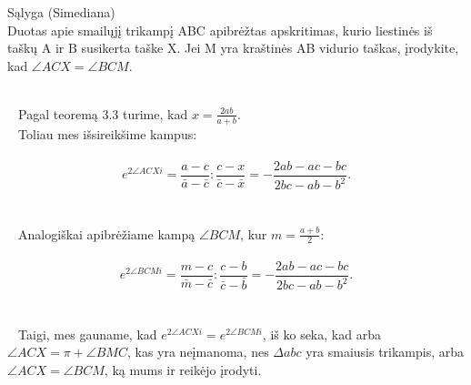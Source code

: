      \begin{pavnr}
Sąlyga (Simediana)
\\ Duotas apie smailųjį trikampį ABC apibrėžtas apskritimas, kurio
liestinės iš taškų A ir B susikerta taške X. Jei M yra kraštinės 
AB vidurio taškas, įrodykite, kad $\angle ACX = \angle BCM$.
\end{pavnr}
\begin{sprendimas}
\\ $\phantom{a}$ Pagal teoremą 3.3 turime, kad $ x= \frac {2ab}{a+b}$.
\\$\phantom{a}$ Toliau mes išsireikšime kampus:
\\
\\ $$ e^{ 2\angle ACX i} = \frac { a-c}{ \bar a - \bar c} : \frac {c-x}{\bar c - \bar x}=
- \frac { 2ab -ac-bc}{2bc - ab- b^2}.$$
\\
\\$\phantom{a}$ Analogiškai apibrėžiame kampą $ \angle BCM $, kur $m = \frac {a+b}{2}$:
\\
\\  $$ e^{2 \angle BCM i} = \frac { m-c}{ \bar m - \bar c} : \frac {c-b}{\bar c - \bar b}=
- \frac { 2ab -ac-bc}{2bc - ab- b^2}.$$
\\
\\$\phantom{a}$ Taigi, mes gauname, kad  $ e^{ 2 \angle ACX i} = e^{2 \angle BCM i}$, iš ko seka, kad arba $ \angle ACX = \pi + \angle BMC$, kas yra neįmanoma, nes $\Delta abc$ yra smaiusis trikampis, arba $\angle ACX = \angle BCM$, ką mums ir reikėjo įrodyti.
\end{sprendimas}

